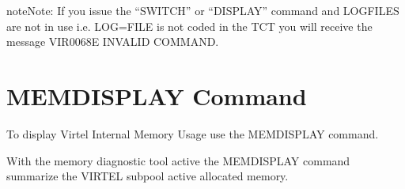 \documentclass[letterpaper,10pt,english]{sphinxmanual}
\begin{document}
\begin{sphinxVerbatim}[commandchars=\\\{\}]
                 
                
\end{sphinxVerbatim}

\begin{sphinxadmonition}{note}{Note:}
\sphinxAtStartPar
If you issue the “SWITCH” or “DISPLAY” command and LOGFILES are not in use i.e. LOG=FILE is not coded in the TCT you will receive the message VIR0068E INVALID COMMAND.
\end{sphinxadmonition}

\newpage

\ignorespaces 

\section{MEMDISPLAY Command}
\label{\detokenize{audit_operations_ and_performance:memdisplay-command}}\label{\detokenize{audit_operations_ and_performance:index-11}}
\sphinxAtStartPar
To display Virtel Internal Memory Usage use the MEMDISPLAY command.

\begin{sphinxVerbatim}[commandchars=\\\{\}]
\end{sphinxVerbatim}

\sphinxAtStartPar
With the memory diagnostic tool active the MEMDISPLAY command summarize the VIRTEL subpool active allocated memory.
\end{document}
